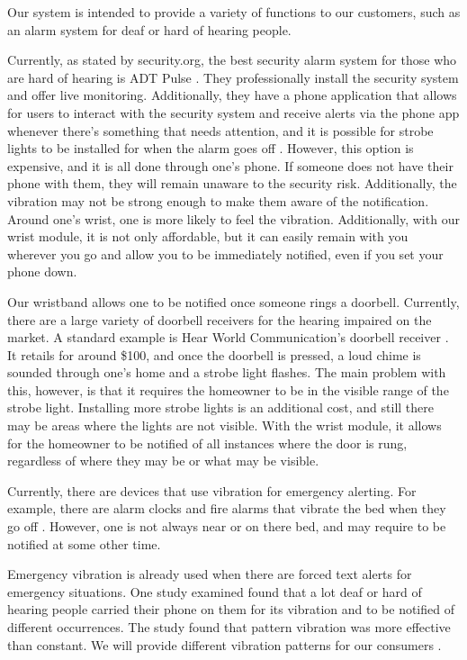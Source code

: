 Our system is intended to provide a variety of functions to our customers, such as an alarm system for deaf or hard of hearing people.

Currently, as stated by security.org, the best security alarm system for those who are hard of hearing is ADT Pulse \cite{Vigderman2021}. They professionally install the security system and offer live monitoring. Additionally, they have a phone application that allows for users to interact with the security system and receive alerts via the phone app whenever there’s something that needs attention, and it is possible for strobe lights to be installed for when the alarm goes off \cite{Zions2019}. However, this option is expensive, and it is all done through one’s phone. If someone does not have their phone with them, they will remain unaware to the security risk. Additionally, the vibration may not be strong enough to make them aware of the notification. Around one's wrist, one is more likely to feel the vibration. Additionally, with our wrist module, it is not only affordable, but it can easily remain with you wherever you go and allow you to be immediately notified, even if you set your phone down.

Our wristband allows one to be notified once someone rings a doorbell. Currently, there are a large variety of doorbell receivers for the hearing impaired on the market. A standard example is Hear World Communication's doorbell receiver \cite{HearWorldStrobe}. It retails for around \$100, and once the doorbell is pressed, a loud chime is sounded through one’s home and a strobe light flashes. The main problem with this, however, is that it requires the homeowner to be in the visible range of the strobe light. Installing more strobe lights is an additional cost, and still there may be areas where the lights are not visible. With the wrist module, it allows for the homeowner to be notified of all instances where the door is rung, regardless of where they may be or what may be visible.

Currently, there are devices that use vibration for emergency alerting. For example, there are alarm clocks and fire alarms that vibrate the bed when they go off \cite{WalmartAlarm} \cite{AllegroFire}. However, one is not always near or on there bed, and may require to be notified at some other time.

Emergency vibration is already used when there are forced text alerts for emergency situations. One study examined found that a lot deaf or hard of hearing people carried their phone on them for its vibration and to be notified of different occurrences. The study found that pattern vibration was more effective than constant. We will provide different vibration patterns for our consumers \cite{Harkins2010}.
